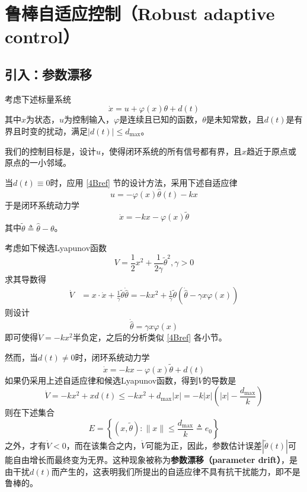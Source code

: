 \section{鲁棒自适应控制（Robust adaptive control）}\label{4Eref}
\subsection{引入：参数漂移}
考虑下述标量系统
\begin{equation}
    \dot{x} = u + \varphi(x)\theta + d(t)\label{Sys:with_disturbance}
\end{equation}
其中$x$为状态，$u$为控制输入，$\varphi$是连续且已知的函数，$\theta$是未知常数，且$d(t)$是有界且时变的扰动，满足$|d(t)|\le d_{\max}$。

我们的控制目标是，设计$u$，使得闭环系统的所有信号都有界，且$x$趋近于原点或原点的一小邻域。

当$d(t)\equiv 0$时，应用 \ref{4Bref} 节的设计方法，采用下述自适应律
\[ u=-\varphi(x)\hat{\theta}(t)-kx\]
于是闭环系统动力学
\[\dot{x}=-kx-\varphi(x)\tilde{\theta}\]
其中$\tilde{\theta} \triangleq \hat{\theta}-\theta$。

考虑如下候选Lyapunov函数
\begin{equation}
    V=\frac12 x^2+\frac{1}{2\gamma}\tilde{\theta}^2,\gamma>0\label{robust_lya}
\end{equation}
求其导数得
\begin{align}
    \dot{V}&=x\cdot\dot{x}+\frac{1}{\gamma}\tilde{\theta}\dot{\hat{\theta}}
    =-kx^2+\frac{1}{\gamma}\tilde{\theta}(\dot{\hat{\theta}}-\gamma x\varphi(x))\label{robust_lya_dot}
\end{align}
则设计
\begin{equation}
    \dot{\hat{\theta}}=\gamma x\varphi(x)\label{adaptive_nodisturbance}
\end{equation}
即可使得$\dot{V}=-kx^2$半负定，之后的分析类似 \ref{4Bref} 各小节。

然而，当$d(t)\ne 0$时，闭环系统动力学
\[\dot{x}=-kx-\varphi(x)\tilde{\theta}+d(t)\]
如果仍采用上述自适应律和候选Lyapunov函数，得到$V$的导数是
\[\dot{V}=-kx^2+x d(t)\le -kx^2+d_{\max}|x|=-k|x|\left(|x|-\frac{d_{\max}}{k}\right)\]
则在下述集合
\begin{equation}
    E = \left\{(x,\tilde{\theta}): \| x \| \leq \frac{d_{\max}}{k} \triangleq e_{0}\right\}\label{dead-zone}
\end{equation}
之外，才有$\dot{V}<0$，而在该集合之内，$\dot{V}$可能为正，因此，参数估计误差$|\tilde{\theta}(t)|$可能自由增长而最终变为无界。这种现象被称为{\bf 参数漂移（parameter drift）}，是由干扰$d(t)$而产生的，这表明我们所提出的自适应律不具有抗干扰能力，即不是鲁棒的。

